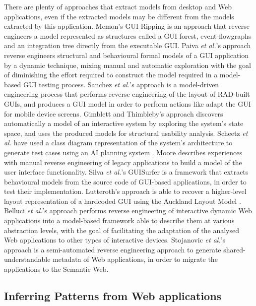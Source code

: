There are plenty of approaches that extract models from desktop and Web applications, even if the extracted models may be different from the models extracted by this application. Memon's GUI Ripping \cite{memon2003gui} is an approach that reverse engineers a model represented as structures called a GUI forest, event-flowgraphs and an integration tree directly from the executable GUI. Paiva \textit{et al.}'s approach \cite{paiva2007towards,paiva2008reverse} reverse engineers structural and behavioural formal models of a GUI application by a dynamic technique, mixing manual and automatic exploration with the goal of diminishing the effort required to construct the model required in a model-based GUI testing process. Sanchez \textit{et al.}'s approach \cite{sanchez2010model} is a model-driven engineering process that performs reverse engineering of the layout of RAD-built GUIs, and produces a GUI model in order to perform actions like adapt the GUI for mobile device screens. Gimblett and Thimbleby's approach \cite{gimblett2010user} discovers automatically a model of an interactive system by exploring the system's state space, and uses the produced models for structural usability analysis. Scheetz \textit{et al.} have used a class diagram representation of the system’s architecture to generate test cases using an AI planning system \cite{scheetz1999generating}. Moore \cite{moore1996rule} describes experiences with manual reverse engineering of legacy applications to build a model of the user interface functionality. Silva \textit{et al.}'s GUISurfer \cite{Silva:2010:GTT:1822018.1822045} is a framework that extracts behavioural models from the source code of GUI-based applications, in order to test their implementation. Lutteroth's approach \cite{Lutteroth:2008:ARE:1378337.1378350} is able to recover a higher-level layout representation of a hardcoded GUI using the Auckland Layout Model \cite{Zeidler:2013:ALE:2501988.2502007}. Belluci \textit{et al.}'s approach \cite{Bellucci:2012:ARE:2166966.2167004} performs reverse engineering of interactive dynamic Web applications into a model-based framework able to describe them at various abstraction levels, with the goal of facilitating the adaptation of the analysed Web applications to other types of interactive devices. Stojanovic \textit{et al.}'s approach \cite{stojanovic2002reverse} is a semi-automated reverse engineering approach to generate shared-understandable metadata of Web applications, in order to migrate the applications to the Semantic Web.

\subsection{Inferring Patterns from Web applications}

